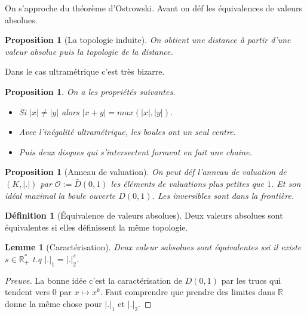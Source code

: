 \documentclass[a4paper,12pt]{book}
\newcommand{\R}{\mathbb{R}}
\newcommand{\Or}{\mathcal{O}}
\theoremstyle{plain}
\newtheorem{lem}[subsection]{Lemme}
\newtheorem{prop}[subsection]{Proposition}
\theoremstyle{definition}
\newtheorem{defn}[subsection]{Définition}
\theoremstyle{remark}
\begin{document}
On s'approche du théorème d'Ostrowski. Avant on déf les équivalences
de valeurs absolues.
\begin{prop}[La topologie induite]
    On obtient une distance à partir d'une valeur absolue puis la 
    topologie de la distance.
\end{prop}
Dans le cas ultramétrique c'est très bizarre.
\begin{prop}
    On a les propriétés suivantes.
    \begin{itemize}
        \item Si $|x|\ne |y|$ alors $|x+y|=max(|x|,|y|)$.
        \item Avec l'inégalité ultramétrique, les boules ont un seul
            centre.
        \item Puis deux disques qui s'intersectent forment en fait une
            chaine.
    \end{itemize}
\end{prop}
\begin{prop}[Anneau de valuation]
    On peut déf l'anneau de valuation de $(K,|.|)$ par 
    $\Or:=\bar D(0,1)$ les éléments de valuations plus petites que $1$.
    Et son idéal maximal la boule ouverte $D(0,1)$. Les inversibles
    sont dans la frontière.
\end{prop}
\begin{defn}[Équivalence de valeurs absolues]
    Deux valeurs absolues sont équivalentes si elles définissent la 
    même topologie.
\end{defn}
\begin{lem}[Caractérisation]
    Deux valeur sabsolues sont équivalentes ssi il existe 
    $s\in \R^*_+$ t.q $|.|_1=|.|_2^s$.
\end{lem}
\begin{proof}[Preuve]
    La bonne idée c'est la caractérisation de $D(0,1)$ par les trucs
    qui tendent vers $0$ par $x\mapsto x^k$. Faut comprendre que 
    prendre des limites dans $\R$ donne la même chose pour 
    $|.|_1$ et $|.|_2$.
\end{proof}
\end{document}
